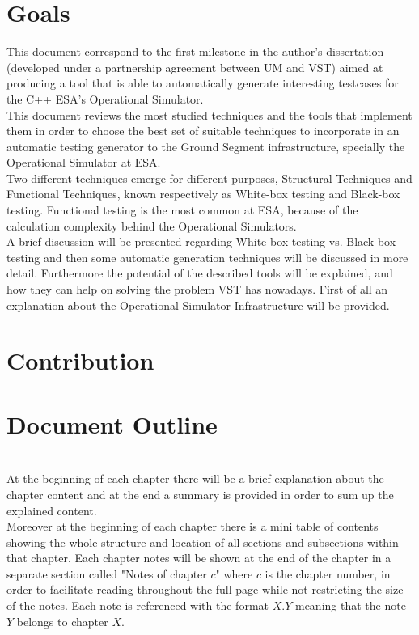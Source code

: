 \section{Goals}
This document correspond to the first milestone in the author's dissertation (developed under a partnership agreement between \ac{UM} and \ac{VST}) aimed at producing a tool
that is able to automatically generate interesting testcases for the C++ \ac{ESA}'s Operational Simulator.\\
This document reviews the most studied techniques
and the tools that implement them in order to choose the best set of
suitable techniques to incorporate in an automatic
testing generator to the Ground Segment infrastructure, specially the
Operational Simulator at \ac{ESA}.\\
Two different techniques emerge for different purposes, Structural
Techniques and Functional Techniques,
known respectively as White-box\cite{stt} testing and Black-box\cite{black} testing.
Functional testing is the most common at \ac{ESA}, because of the
calculation complexity behind the Operational Simulators.\\
A brief discussion will be presented regarding White-box testing vs. Black-box
testing and then some automatic generation techniques will be discussed in more detail.
Furthermore the potential of the described tools will be explained, and how they can help
on solving the problem \ac{VST} has nowadays. First of all an explanation about the Operational Simulator Infrastructure will be provided.

\section{Contribution}
\section{Document Outline}
\\
At the beginning of each chapter there will be a brief explanation about the chapter content and at
the end a summary is provided in order to sum up the explained content.\\

Moreover at the beginning of each chapter there is a mini table
of contents showing the whole structure and location of all sections and subsections within that chapter.
Each chapter notes will be shown at the end of the chapter in a separate section called "Notes of chapter $c$" where $c$ is the chapter number,
in order to facilitate reading throughout the full page while not restricting the size of the notes.
Each note is referenced with the format $X.Y$ meaning that
the note $Y$ belongs to chapter $X$.
\secendnote
